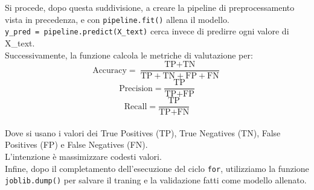 \documentclass[a4paper,12pt]{report}
\begin{document}
Si procede, dopo questa suddivisione, a creare la pipeline di preprocessamento vista in precedenza, e con \texttt{pipeline.fit()} allena il modello.\\
\texttt{y\_pred = pipeline.predict(X\_text)} cerca invece di predirre ogni valore di X\_text.\\
Successivamente, la funzione calcola le metriche di valutazione per:
\[
\text{Accuracy} = \frac{\text{TP} + \text{TN}}{\text{TP} + \text{TN} + \text{FP} + \text{FN}}
\]
\[
\text{Precision} = \frac{\text{TP}}{\text{TP} + \text{FP}}
\]
\[
\text{Recall} = \frac{\text{TP}}{\text{TP} + \text{FN}}
\]\\
Dove si usano i valori dei True Positives (TP), True Negatives (TN), False Positives (FP) e False Negatives (FN).\\
L'intenzione è massimizzare codesti valori.\\
Infine, dopo il completamento dell'esecuzione del ciclo \texttt{for}, utilizziamo la funzione \texttt{joblib.dump()} per salvare il traning e la validazione fatti come modello allenato.\\
\end{document}
